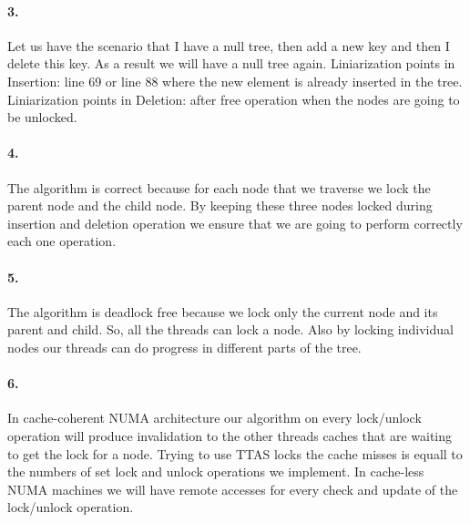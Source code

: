 \paragraph{3.}
Let us have the scenario that I have a null tree, then add a new key
and then I delete this key. As a result we will have a null tree
again.
Liniarization points in Insertion: line 69 or line 88 where the new
element is already inserted in the tree.
Liniarization points in Deletion: after free operation when the nodes
are going to be unlocked.

\paragraph{4.}
The algorithm is correct because for each node that we traverse we
lock the parent node and the child node. By keeping these three nodes
locked during insertion and deletion operation we ensure that we are
going to perform correctly each one operation.

\paragraph{5.}
The algorithm is deadlock free because we lock only the current node
and its parent and child. So, all the threads can lock a node. Also by
locking individual nodes our threads can do progress in different
parts of the tree.

\paragraph{6.}
In cache-coherent NUMA architecture our algorithm on every lock/unlock
operation will produce invalidation to the other threads caches that
are waiting to get the lock for a node. Trying to use TTAS locks the
cache misses is equall to the numbers of set lock and unlock
operations we implement. In cache-less NUMA machines we will have
remote accesses for every check and update of the lock/unlock
operation. 
